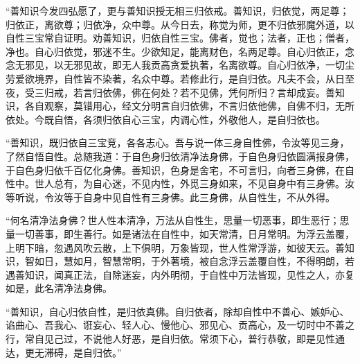 \documentclass[12pt,twoside,openany]{book}
\begin{document}
“善知识今发四弘愿了，更与善知识授无相三归依戒。善知识，{\color{red}归依觉，两足尊；归依正，离欲尊；归依净，众中尊。}从今日去，称觉为师，更不归依邪魔外道，以自性三宝常自证明。劝善知识，归依自性三宝。佛者，觉也；法者，正也；僧者，净也。自心归依觉，邪迷不生。少欲知足，能离财色，名两足尊。自心归依正，念念无邪见，以无邪见故，即无人我贡高贪爱执著，名离欲尊。自心归依净，一切尘劳爱欲境界，自性皆不染著，名众中尊。若修此行，是自归依。凡夫不会，从日至夜，受三归戒，若言归依佛，佛在何处？若不见佛，凭何所归？言却成妄。善知识，各自观察，莫错用心，经文分明言自归依佛，不言归依他佛，自佛不归，无所依处。今既自悟，各须归依自心三宝，内调心性，外敬他人，是自归依也。

“善知识，既归依自三宝竞，各各志心。吾与说一体三身自性佛，令汝等见三身，了然自悟自性。总随我道：于自色身归依清净法身佛，于自色身归依圆满报身佛，于自色身归依千百亿化身佛。善知识，色身是舍宅，不可言归，向者三身佛，在自性中。世人总有，为自心迷，不见内性，外觅三身如来，不见自身中有三身佛。汝等听说，令汝等于自身中见自性有三身佛。此三身佛，从自性生，不从外得。

“何名清净法身佛？世人性本清净，万法从自性生，思量一切恶事，即生恶行；思量一切善事，即生善行。如是诸法在自性中，如天常清，日月常明。为浮云盖覆，上明下暗，忽遇风吹云散，上下俱明，万象皆现，世人性常浮游，如彼天云。善知识，智如日，慧如月，智慧常明，于外著境，被自念浮云盖覆自性，不得明朗，若遇善知识，闻真正法，自除迷妄，内外明彻，于自性中万法皆现，见性之人，亦复如是，此名清净法身佛。

“善知识，自心归依自性，是归依真佛。自归依者，除却自性中不善心、嫉妒心、谄曲心、吾我心、诳妄心、轻人心、慢他心、邪见心、贡高心，及一切时中不善之行，常自见己过，不说他人好恶，是自归依。常须下心，普行恭敬，即是见性通达，更无滞碍，是自归依。”
\end{document}
